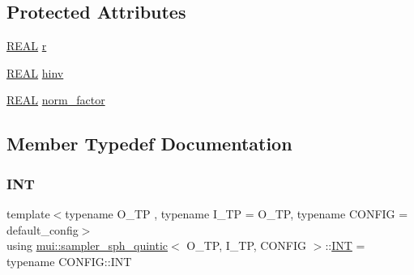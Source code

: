 \subsection*{Protected Attributes}
\begin{DoxyCompactItemize}
\item 
\hyperlink{classmui_1_1sampler__sph__quintic_ab47a0d5297b716d51c2ab6857f586103}{R\+E\+AL} \hyperlink{classmui_1_1sampler__sph__quintic_a7b9f8e91cc8b7460c1e1b9057da72131}{r}
\item 
\hyperlink{classmui_1_1sampler__sph__quintic_ab47a0d5297b716d51c2ab6857f586103}{R\+E\+AL} \hyperlink{classmui_1_1sampler__sph__quintic_a3550f980c8a14fe0f9ee67ec28335ac5}{hinv}
\item 
\hyperlink{classmui_1_1sampler__sph__quintic_ab47a0d5297b716d51c2ab6857f586103}{R\+E\+AL} \hyperlink{classmui_1_1sampler__sph__quintic_af586abe7af25f4d60ba13b0c4e0abc27}{norm\+\_\+factor}
\end{DoxyCompactItemize}


\subsection{Member Typedef Documentation}
\mbox{\label{classmui_1_1sampler__sph__quintic_a03ecc5fe622f35fdf1f2123c55d19c3b}} 
\subsubsection{\texorpdfstring{I\+NT}{INT}}
{\footnotesize\ttfamily template$<$typename O\+\_\+\+TP , typename I\+\_\+\+TP  = O\+\_\+\+TP, typename C\+O\+N\+F\+IG  = default\+\_\+config$>$ \\
using \hyperlink{classmui_1_1sampler__sph__quintic}{mui\+::sampler\+\_\+sph\+\_\+quintic}$<$ O\+\_\+\+TP, I\+\_\+\+TP, C\+O\+N\+F\+IG $>$\+::\hyperlink{classmui_1_1sampler__sph__quintic_a03ecc5fe622f35fdf1f2123c55d19c3b}{I\+NT} =  typename C\+O\+N\+F\+I\+G\+::\+I\+NT}

\mbox{\label{classmui_1_1sampler__sph__quintic_a3814b885ebc0a019391849f0cf976d7e}} 
